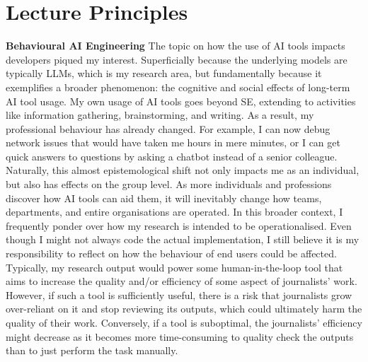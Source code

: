 \documentclass[11pt]{article}
\begin{document}
\section{Lecture Principles}
\textbf{Behavioural AI Engineering} The topic on how the use of AI tools impacts developers piqued my interest. Superficially because the underlying models are typically LLMs, which is my research area, but fundamentally because it exemplifies a broader phenomenon: the cognitive and social effects of long-term AI tool usage. My own usage of AI tools goes beyond SE, extending to activities like information gathering, brainstorming, and writing. As a result, my professional behaviour has already changed. For example, I can now debug network issues that would have taken me hours in mere minutes, or I can get quick answers to questions by asking a chatbot instead of a senior colleague. Naturally, this almost epistemological shift not only impacts me as an individual, but also has effects on the group level. As more individuals and professions discover how AI tools can aid them, it will inevitably change how teams, departments, and entire organisations are operated. In this broader context, I frequently ponder over how my research is intended to be operationalised. Even though I might not always code the actual implementation, I still believe it is my responsibility to reflect on how the behaviour of end users could be affected. Typically, my research output would power some human-in-the-loop tool that aims to increase the quality and/or efficiency of some aspect of journalists' work. However, if such a tool is sufficiently useful, there is a risk that journalists grow over-reliant on it and stop reviewing its outputs, which could ultimately harm the quality of their work. Conversely, if a tool is suboptimal, the journalists' efficiency might decrease as it becomes more time-consuming to quality check the outputs than to just perform the task manually.
\end{document}
